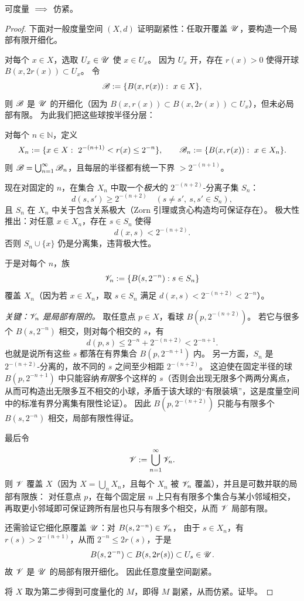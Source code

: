 \begin{theorem}[Stone]
    可度量 $\implies$ 仿紧。
\end{theorem}
\begin{proof}
    下面对一般度量空间 $(X,d)$ 证明副紧性：任取开覆盖 $\mathscr U$，要构造一个局部有限开细化。

对每个 $x\in X$，选取 $U_x\in\mathscr U$ 使 $x\in U_x$。
因为 $U_x$ 开，存在 $r(x)>0$ 使得开球 $B(x,2r(x))\subset U_x$。
令
\[
\mathscr B:=\{B(x,r(x)):\ x\in X\},
\]
则 $\mathscr B$ 是 $\mathscr U$ 的开细化（因为 $B(x,r(x))\subset B(x,2r(x))\subset U_x$），但未必局部有限。
为此我们把这些球按半径分层：

对每个 $n\in\mathbb N$，定义
\[
X_n:=\{x\in X:\ 2^{-(n+1)}<r(x)\le 2^{-n}\},
\qquad
\mathscr B_n:=\{B(x,r(x)):\ x\in X_n\}.
\]
则 $\mathscr B=\bigcup_{n=1}^\infty \mathscr B_n$，且每层的半径都有统一下界 $>2^{-(n+1)}$。

现在对固定的 $n$，在集合 $X_n$ 中取一个\emph{极大}的 $2^{-(n+2)}$-分离子集 $S_n$：
\[
d(s,s')\ge 2^{-(n+2)}\quad(s\ne s',\ s,s'\in S_n),
\]
且 $S_n$ 在 $X_n$ 中关于包含关系极大（Zorn 引理或贪心构造均可保证存在）。
极大性推出：对任意 $x\in X_n$，存在 $s\in S_n$ 使得
\[
d(x,s)<2^{-(n+2)}.
\]
否则 $S_n\cup\{x\}$ 仍是分离集，违背极大性。

于是对每个 $n$，族
\[
\mathscr V_n:=\{B(s,2^{-n}) : s\in S_n\}
\]
覆盖 $X_n$（因为若 $x\in X_n$，取 $s\in S_n$ 满足 $d(x,s)<2^{-(n+2)}<2^{-n}$）。

\emph{关键：$\mathscr V_n$ 是局部有限的。}
取任意点 $p\in X$，看球 $B(p,2^{-(n+2)})$。
若它与很多个 $B(s,2^{-n})$ 相交，则对每个相交的 $s$，有
\[
d(p,s)\le 2^{-n}+2^{-(n+2)}<2^{-n+1}.
\]
也就是说所有这些 $s$ 都落在有界集合 $B(p,2^{-n+1})$ 内。
另一方面，$S_n$ 是 $2^{-(n+2)}$-分离的，故不同的 $s$ 之间至少相距 $2^{-(n+2)}$。
这迫使在固定半径的球 $B(p,2^{-n+1})$ 中只能容纳\emph{有限}多个这样的 $s$（否则会出现无限多个两两分离点，
从而可构造出无限多互不相交的小球，矛盾于该大球的“有限装填”，这是度量空间中的标准有界分离集有限性论证）。
因此 $B(p,2^{-(n+2)})$ 只能与有限多个 $B(s,2^{-n})$ 相交，局部有限性得证。

最后令
\[
\mathscr V:=\bigcup_{n=1}^\infty \mathscr V_n.
\]
则 $\mathscr V$ 覆盖 $X$（因为 $X=\bigcup_n X_n$，且每个 $X_n$ 被 $\mathscr V_n$ 覆盖），并且是可数并联的局部有限族：
对任意点 $p$，在每个固定层 $n$ 上只有有限多个集合与某小邻域相交，
再取更小邻域即可保证跨所有层也只与有限多个相交，从而 $\mathscr V$ 局部有限。

还需验证它细化原覆盖 $\mathscr U$：对 $B(s,2^{-n})\in\mathscr V_n$，
由于 $s\in X_n$，有 $r(s)>2^{-(n+1)}$，从而 $2^{-n}\le 2r(s)$，于是
\[
B(s,2^{-n})\subset B(s,2r(s))\subset U_s\in\mathscr U.
\]
故 $\mathscr V$ 是 $\mathscr U$ 的局部有限开细化。
因此任意度量空间副紧。

将 $X$ 取为第二步得到可度量化的 $M$，即得 $M$ 副紧，从而仿紧。证毕。
\end{proof}

